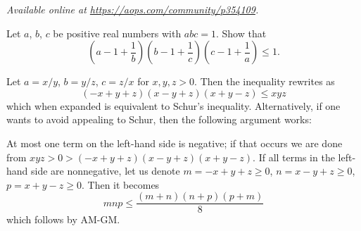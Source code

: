 \textsl{Available online at \url{https://aops.com/community/p354109}.}
\begin{mdframed}[style=mdpurplebox,frametitle={Problem statement}]
Let $a$, $b$, $c$ be positive real numbers with $abc = 1$.
Show that
\[
  \left( a - 1 + \frac 1b \right)
  \left( b - 1 + \frac 1c \right)
  \left( c - 1 + \frac 1a \right)
  \le 1.
\]
\end{mdframed}
Let $a = x/y$, $b = y/z$, $c = z/x$ for $x,y,z > 0$.
Then the inequality rewrites as
\[ (-x+y+z)(x-y+z)(x+y-z) \le xyz \]
which when expanded is equivalent to Schur's inequality.
Alternatively, if one wants to avoid appealing to Schur,
then the following argument works:
\begin{itemize}
  \ii At most one term on the left-hand side is negative;
  if that occurs we are done from $xyz > 0 > (-x+y+z)(x-y+z)(x+y-z)$.
  \ii If all terms in the left-hand side are nonnegative,
  let us denote $m = -x+y+z \ge 0$, $n = x-y+z \ge 0$, $p = x+y-z \ge 0$.
  Then it becomes
  \[ mnp \le \frac{(m+n)(n+p)(p+m)}{8} \]
  which follows by AM-GM.
\end{itemize}
\pagebreak